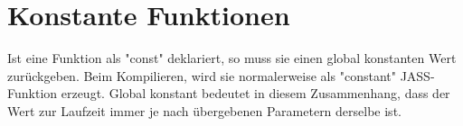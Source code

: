 \section{Konstante Funktionen}
Ist eine Funktion als "const" deklariert, so muss sie einen global konstanten Wert zurückgeben. Beim Kompilieren, wird
sie normalerweise als "constant" JASS-Funktion erzeugt. Global konstant bedeutet in diesem Zusammenhang, dass der Wert
zur Laufzeit immer je nach übergebenen Parametern derselbe ist. 